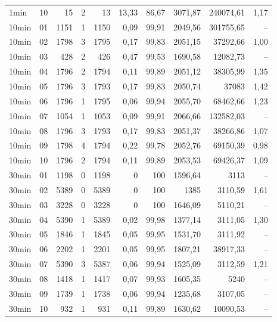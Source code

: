 \begin{longtable}{llrrrrrrrr}
1min & 10 & 15 & 2 & 13 & 13,33 & 86,67 & 3071,87 & 240074,61 & 1,17 \\
10min & 01 & 1151 & 1 & 1150 & 0,09 & 99,91 & 2049,56 & 301755,65 & -- \\
10min & 02 & 1798 & 3 & 1795 & 0,17 & 99,83 & 2051,15 & 37292,66 & 1,00 \\
10min & 03 & 428 & 2 & 426 & 0,47 & 99,53 & 1690,58 & 12082,73 & -- \\
10min & 04 & 1796 & 2 & 1794 & 0,11 & 99,89 & 2051,12 & 38305,99 & 1,35 \\
10min & 05 & 1796 & 3 & 1793 & 0,17 & 99,83 & 2050,74 & 37083 & 1,42 \\
10min & 06 & 1796 & 1 & 1795 & 0,06 & 99,94 & 2055,70 & 68462,66 & 1,23 \\
10min & 07 & 1054 & 1 & 1053 & 0,09 & 99,91 & 2066,66 & 132582,03 & -- \\
10min & 08 & 1796 & 3 & 1793 & 0,17 & 99,83 & 2051,37 & 38266,86 & 1,07 \\
10min & 09 & 1798 & 4 & 1794 & 0,22 & 99,78 & 2052,76 & 69150,39 & 0,98 \\
10min & 10 & 1796 & 2 & 1794 & 0,11 & 99,89 & 2053,53 & 69426,37 & 1,09 \\
30min & 01 & 1198 & 0 & 1198 & 0 & 100 & 1596,64 & 3113 & -- \\
30min & 02 & 5389 & 0 & 5389 & 0 & 100 & 1385 & 3110,59 & 1,61 \\
30min & 03 & 3228 & 0 & 3228 & 0 & 100 & 1646,09 & 5110,21 & -- \\
30min & 04 & 5390 & 1 & 5389 & 0,02 & 99,98 & 1377,14 & 3111,05 & 1,30 \\
30min & 05 & 1846 & 1 & 1845 & 0,05 & 99,95 & 1531,70 & 3111,92 & -- \\
30min & 06 & 2202 & 1 & 2201 & 0,05 & 99,95 & 1807,21 & 38917,33 & -- \\
30min & 07 & 5390 & 3 & 5387 & 0,06 & 99,94 & 1525,09 & 3112,59 & 1,21 \\
30min & 08 & 1418 & 1 & 1417 & 0,07 & 99,93 & 1605,35 & 5240 & -- \\
30min & 09 & 1739 & 1 & 1738 & 0,06 & 99,94 & 1235,68 & 3107,05 & -- \\
30min & 10 & 932 & 1 & 931 & 0,11 & 99,89 & 1630,62 & 10090,53 & -- \\
\bottomrule
\end{longtable}
